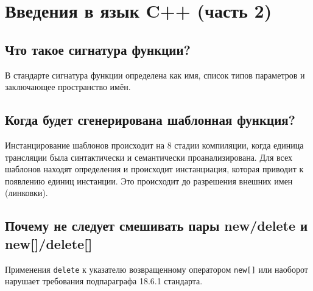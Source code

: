 \documentclass[a4paper]{article}
\begin{document}
\setcounter{section}{1}
\section{Введения в язык C++ (часть 2)}
\subsection{Что такое сигнатура функции?}
В стандарте сигнатура функции определена как имя, список
типов параметров и заключающее пространство имён.
\subsection{Когда будет сгенерирована шаблонная функция?}
Инстанцирование шаблонов происходит на 8 стадии компиляции,
когда единица трансляции была синтактически и семантически
проанализирована. Для всех шаблонов находят определения и
происходит инстанциация, которая приводит к появлению единиц
инстанции. Это происходит до разрешения внешних имен (линковки).

\subsection{Почему не следует смешивать пары new/delete и 
new[]/delete[]}
Применения \texttt{delete} к указателю возвращенному
оператором \texttt{new[]} или наоборот нарушает требования 
подпараграфа 18.6.1 стандарта.
\end{document}
